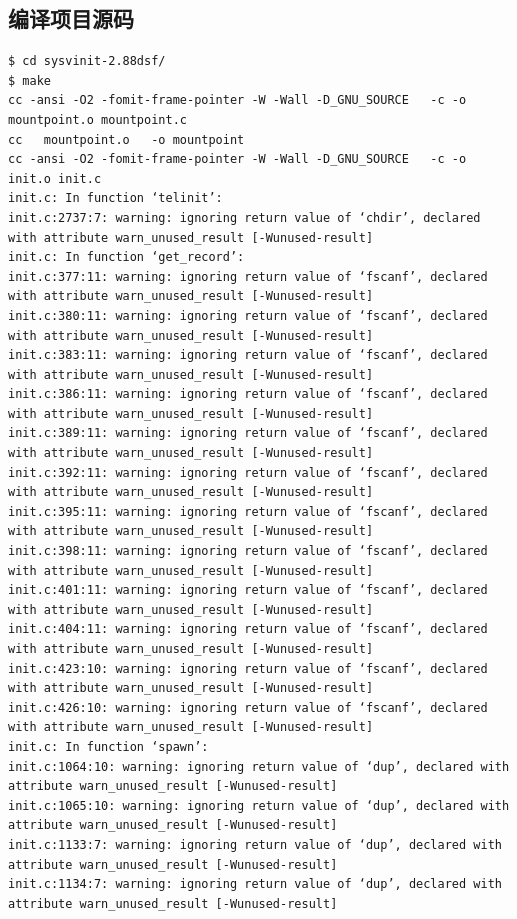 \subsection{编译项目源码}

{\begin{shaded}\begin{verbatim}
$ cd sysvinit-2.88dsf/
$ make
cc -ansi -O2 -fomit-frame-pointer -W -Wall -D_GNU_SOURCE   -c -o mountpoint.o mountpoint.c
cc   mountpoint.o   -o mountpoint
cc -ansi -O2 -fomit-frame-pointer -W -Wall -D_GNU_SOURCE   -c -o init.o init.c
init.c: In function ‘telinit’:
init.c:2737:7: warning: ignoring return value of ‘chdir’, declared with attribute warn_unused_result [-Wunused-result]
init.c: In function ‘get_record’:
init.c:377:11: warning: ignoring return value of ‘fscanf’, declared with attribute warn_unused_result [-Wunused-result]
init.c:380:11: warning: ignoring return value of ‘fscanf’, declared with attribute warn_unused_result [-Wunused-result]
init.c:383:11: warning: ignoring return value of ‘fscanf’, declared with attribute warn_unused_result [-Wunused-result]
init.c:386:11: warning: ignoring return value of ‘fscanf’, declared with attribute warn_unused_result [-Wunused-result]
init.c:389:11: warning: ignoring return value of ‘fscanf’, declared with attribute warn_unused_result [-Wunused-result]
init.c:392:11: warning: ignoring return value of ‘fscanf’, declared with attribute warn_unused_result [-Wunused-result]
init.c:395:11: warning: ignoring return value of ‘fscanf’, declared with attribute warn_unused_result [-Wunused-result]
init.c:398:11: warning: ignoring return value of ‘fscanf’, declared with attribute warn_unused_result [-Wunused-result]
init.c:401:11: warning: ignoring return value of ‘fscanf’, declared with attribute warn_unused_result [-Wunused-result]
init.c:404:11: warning: ignoring return value of ‘fscanf’, declared with attribute warn_unused_result [-Wunused-result]
init.c:423:10: warning: ignoring return value of ‘fscanf’, declared with attribute warn_unused_result [-Wunused-result]
init.c:426:10: warning: ignoring return value of ‘fscanf’, declared with attribute warn_unused_result [-Wunused-result]
init.c: In function ‘spawn’:
init.c:1064:10: warning: ignoring return value of ‘dup’, declared with attribute warn_unused_result [-Wunused-result]
init.c:1065:10: warning: ignoring return value of ‘dup’, declared with attribute warn_unused_result [-Wunused-result]
init.c:1133:7: warning: ignoring return value of ‘dup’, declared with attribute warn_unused_result [-Wunused-result]
init.c:1134:7: warning: ignoring return value of ‘dup’, declared with attribute warn_unused_result [-Wunused-result]

\end{verbatim}
\end{shaded}}
